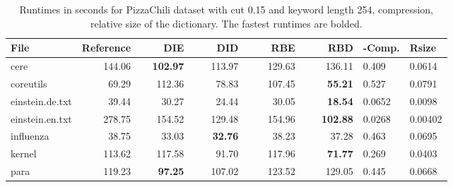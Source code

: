 \documentclass[english,twoside,censored,csm,algorithms-track-2020]{HYthesisML}
\theoremstyle{plain}
\theoremstyle{definition}
\begin{document}
\begin{center}
  \begin{table}
  \begin{tabular} {| l |r r r r r|l l|}
    \hline
    \textbf{File} & \textbf{Reference} & ~~~~\textbf{DIE} & ~~~~\textbf{DID} & ~~~~\textbf{RBE} & ~~~~\textbf{RBD} & \textbf{-Comp.} & \textbf{Rsize} \\
    \hline
    cere & 144.06 & \textbf{102.97} & 113.97 & 129.63 & 136.11            & 0.409  & 0.0614  \\
    coreutils & 69.29 & 112.36 & 78.83 & 107.45 & \textbf{55.21}          & 0.527  & 0.0791  \\
    einstein.de.txt & 39.44 & 30.27 & 24.44 & 30.05 & \textbf{18.54}      & 0.0652 & 0.0098  \\
    einstein.en.txt & 278.75 & 154.52 & 129.48 & 154.96 & \textbf{102.88} & 0.0268 & 0.00402 \\
    influenza & 38.75 & 33.03 & \textbf{32.76} & 38.23 & 37.28            & 0.463  & 0.0695  \\
    kernel & 113.62 & 117.58 & 91.70 & 117.96 & \textbf{71.77}            & 0.269  & 0.0403  \\
    para & 119.23 & \textbf{97.25} & 107.02 & 123.52 & 129.05             & 0.445  & 0.0668  \\
    \hline
  \end{tabular}
  \caption{Runtimes in seconds for PizzaChili dataset with cut 0.15 and keyword length 254, compression, relative size of the dictionary. The fastest runtimes are bolded.}
  \label{runtimes-15-254}
  \end{table}
\end{center}
\end{document}
